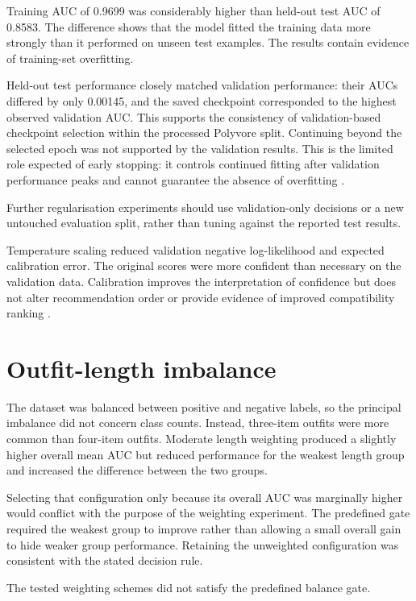 Training AUC of 0.9699 was considerably higher than held-out test AUC of
0.8583. The difference shows that the model fitted the training data more
strongly than it performed on unseen test examples. The results contain
evidence of training-set overfitting.

Held-out test performance closely matched validation performance: their AUCs
differed by only 0.00145, and the saved checkpoint corresponded to the highest
observed validation AUC. This supports the consistency of validation-based
checkpoint selection within the processed Polyvore split. Continuing beyond the selected epoch was not
supported by the validation results. This is the limited role expected of early
stopping: it controls continued fitting after validation performance peaks and
cannot guarantee the absence of overfitting \parencite{prechelt1998early}.

Further regularisation experiments should use validation-only decisions or a
new untouched evaluation split, rather than tuning against the reported test
results.

Temperature scaling reduced validation negative log-likelihood and expected
calibration error. The original scores were more confident than
necessary on the validation data. Calibration improves the interpretation of
confidence but does not alter recommendation order or provide evidence of
improved compatibility ranking \parencite{guo2017calibration}.

\section{Outfit-length imbalance}

The dataset was balanced between positive and negative labels, so the principal
imbalance did not concern class counts. Instead, three-item outfits were more
common than four-item outfits. Moderate length weighting produced a slightly
higher overall mean AUC but reduced performance for the weakest length group and
increased the difference between the two groups.

Selecting that configuration only because its overall AUC was marginally higher
would conflict with the purpose of the weighting experiment. The predefined
gate required the weakest group to improve rather than allowing a small overall
gain to hide weaker group performance. Retaining the unweighted configuration
was consistent with the stated decision rule.

The tested weighting schemes did not satisfy the predefined balance gate.

